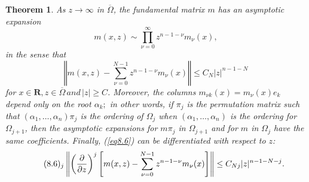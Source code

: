 \documentclass{surv-l}
\theoremstyle{plain}
\newtheorem{theorem}{Theorem}[section]
\theoremstyle{definition}
\numberwithin{equation}{chapter}
\begin{document}
\setcounter{theorem}{3}
\begin{theorem}\label{thm8.4}
As $ z\rightarrow\infty$ in $\overline{\Omega}$, the fundamental matrix $m$ has an asymptotic expansion
\setcounter{equation}{4}
\begin{equation}\label{eq8.5}
m(x, z)\sim\prod_{\nu=0}^{\infty}z^{n-1-\nu}m_{\nu}(x),
\end{equation}
in the sense that
\begin{equation}\label{eq8.6}
\left\Vert m(x, z)-\sum_{\nu=0}^{N-1}z^{n-1-\nu}m_{\nu}(x)\right\Vert\leq C_{N}|z|^{n-1-N}
\end{equation}
for $x\in \mathbf{R}, z\in\overline{\Omega}\, and\,|z|\geq C$.
Moreover, the columns $m_{\nu k}(x)=m_{\nu}(x)e_{k}$ depend only on
the root $\alpha_{k};$ in other words, if $\pi_{j}$ is the
permutation matrix such that $(\alpha_{1}, \ldots,
\alpha_{n})\pi_{j}$ is the ordering of $\Omega_{j}$ when
$(\alpha_{1}, \ldots, \alpha_{n})$ is the ordering for
$\Omega_{j+1}$, then the asymptotic expansions for $m\pi_{j}$ in
$\Omega_{j+1}$ and for $m$ in $\Omega_{j}$ have the same
coefficients. Finally, \emph{(\ref{eq8.6})} can be differentiated with respect to $z$\emph{:}
\begin{equation*}
\tag*{$(8.6)_{j}$} \left\Vert\left(\frac{\partial}{\partial z}\right)^{j}\left[m(x, z)-\sum_{\nu=0}^{N-1}z^{n-1-\nu}m_{\nu}(x)\right]\right\Vert\leq C_{Nj}|z|^{n-1-N-j}.
\end{equation*}
\end{theorem}
\end{document}
